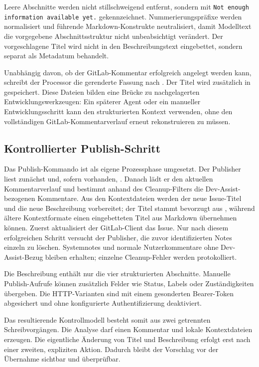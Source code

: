 Leere Abschnitte werden nicht stillschweigend entfernt, sondern mit \texttt{Not enough information available yet.} gekennzeichnet. Nummerierungspräfixe werden normalisiert und führende Markdown-Konstrukte neutralisiert, damit Modelltext die vorgegebene Abschnittsstruktur nicht unbeabsichtigt verändert. Der vorgeschlagene Titel wird nicht in den Beschreibungstext eingebettet, sondern separat als Metadatum behandelt.

Unabhängig davon, ob der GitLab-Kommentar erfolgreich angelegt werden kann, schreibt der Processor die gerenderte Fassung nach . Der Titel wird zusätzlich in  gespeichert. Diese Dateien bilden eine Brücke zu nachgelagerten Entwicklungswerkzeugen: Ein späterer Agent oder ein manueller Entwicklungsschritt kann den strukturierten Kontext verwenden, ohne den vollständigen GitLab-Kommentarverlauf erneut rekonstruieren zu müssen.

\subsection{Kontrollierter Publish-Schritt}

Das Publish-Kommando ist als eigene Prozessphase umgesetzt. Der Publisher liest zunächst  und, sofern vorhanden, . Danach lädt er den aktuellen Kommentarverlauf und bestimmt anhand des Cleanup-Filters die Dev-Assist-bezogenen Kommentare. Aus den Kontextdateien werden der neue Issue-Titel und die neue Beschreibung vorbereitet; der Titel stammt bevorzugt aus , während ältere Kontextformate einen eingebetteten Titel aus Markdown übernehmen können. Zuerst aktualisiert der GitLab-Client das Issue. Nur nach diesem erfolgreichen Schritt versucht der Publisher, die zuvor identifizierten Notes einzeln zu löschen. Systemnotes und normale Nutzerkommentare ohne Dev-Assist-Bezug bleiben erhalten; einzelne Cleanup-Fehler werden protokolliert.

Die Beschreibung enthält nur die vier strukturierten Abschnitte. Manuelle Publish-Aufrufe können zusätzlich Felder wie Status, Labels oder Zuständigkeiten übergeben. Die HTTP-Varianten sind mit einem gesonderten Bearer-Token abgesichert und ohne konfigurierte Authentifizierung deaktiviert.

Das resultierende Kontrollmodell besteht somit aus zwei getrennten Schreibvorgängen. Die Analyse darf einen Kommentar und lokale Kontextdateien erzeugen. Die eigentliche Änderung von Titel und Beschreibung erfolgt erst nach einer zweiten, expliziten Aktion. Dadurch bleibt der Vorschlag vor der Übernahme sichtbar und überprüfbar.

